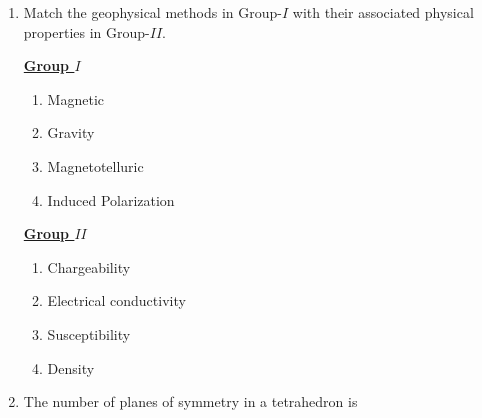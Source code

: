 \documentclass[journal,12pt,onecolumn]{IEEEtran}
\theoremstyle{remark}
\begin{document}
\begin{enumerate}
\item Match the geophysical methods in Group-$I$ with their associated physical properties in Group-$II$.

        \begin{multicols}{2}
            \underline{\textbf{Group $I$}}
            \begin{enumerate}[start =16]
                \item Magnetic
                \item Gravity
                \item Magnetotelluric
                \item Induced Polarization
            \end{enumerate}

            \columnbreak

            \underline{\textbf{Group $II$}}
            \begin{enumerate}
                \item Chargeability
                \item Electrical conductivity
                \item Susceptibility
                \item Density                
            \end{enumerate}
        \end{multicols}
\begin{enumerate}
\end{enumerate}
\hfill{}

\item The number of planes of symmetry in a tetrahedron is
\begin{enumerate}
\end{enumerate}
\hfill{}


\end{enumerate}
\end{document}

